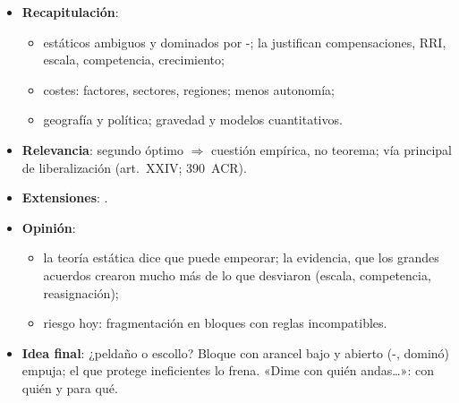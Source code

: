 \documentclass{article}
\begin{document}
\begin{columnas}
\begin{itemize}
\item \textbf{Recapitulación}:
  \begin{itemize}
  \item estáticos ambiguos y dominados por -; la justifican compensaciones, RRI, escala, competencia, crecimiento;
  \item costes: factores, sectores, regiones; menos autonomía;
  \item geografía y política; gravedad y modelos cuantitativos.
  \end{itemize}
\item \textbf{Relevancia}: segundo óptimo $\Rightarrow$ cuestión empírica, no teorema; vía principal de liberalización (art.~XXIV; 390~ACR).
\item \textbf{Extensiones}:      .
\item \textbf{Opinión}:
  \begin{itemize}
  \item la teoría estática dice que puede empeorar; la evidencia, que los grandes acuerdos crearon mucho más de lo que desviaron (escala, competencia, reasignación);
  \item riesgo hoy: fragmentación en bloques con reglas incompatibles.
  \end{itemize}
\item \textbf{Idea final}: ¿peldaño o escollo? Bloque con arancel bajo y abierto (-, dominó) empuja; el que protege ineficientes lo frena. «Dime con quién andas\ldots»: con quién y para qué.
\end{itemize}


\end{columnas}
\end{document}
